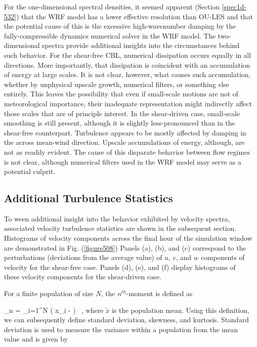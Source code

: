 For the one-dimensional spectral densities, it seemed apparent (Section \autoref{spec1d-532}) that the WRF model has a lower effective resolution than OU-LES and that the potential cause of this is the excessive high-wavenumber damping by the fully-compressible dynamics numerical solver in the WRF model. The two-dimensional spectra provide additional insights into the circumstances behind such behavior. For the shear-free CBL, numerical dissipation occurs equally in all directions. More importantly, that dissipation is coincident with an accumulation of energy at large scales. It is not clear, however, what causes such accumulation, whether by unphysical upscale growth, numerical filters, or something else entirely. This leaves the possibility that even if small-scale motions are not of meteorological importance, their inadequate representation might indirectly affect those scales that are of principle interest. In the shear-driven case, small-scale smoothing is still present, although it is slightly less-pronounced than in the shear-free counterpart. Turbulence appears to be mostly affected by damping in the across mean-wind direction. Upscale accumulations of energy, although, are not as readily evident. The cause of this disparate behavior between flow regimes is not clear, although numerical filters used in the WRF model may serve as a potential culprit.

\subsection{Additional Turbulence Statistics}
\label{turb-stats-534}

To ween additional insight into the behavior exhibited by velocity spectra, associated velocity turbulence statistics are shown in the subsequent section. Histograms of velocity components across the final hour of the simulation window are demonstrated in Fig. (\autoref{figure508}) Panels (a), (b), and (c) correspond to the perturbations (deviations from the average value) of $u$, $v$, and $w$ components of velocity for the shear-free case. Panels (d), (e), and (f) display histograms of these velocity components for the shear-driven case.

For a finite population of size $N$, the $n^{th}$-moment is defined as


\be
\mu_n =  \sum_{i=1}^{N} \left( x_i -  \right)  \mbox{ ,}
\label{moment}
\ee
\noindent where $\widetilde{x}$ is the population mean. Using this definition, we can subsequently define standard deviation, skewness, and kurtosis. Standard deviation is used to measure the variance within a population from the mean value and is given by

